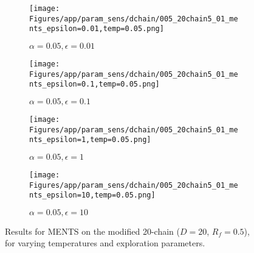 \documentclass{article}
\theoremstyle{plain}
\begin{document}
\begin{appendices}
\begin{figure}
                \begin{subfigure}[b]{0.24\textwidth}
                    \centering
                    \texttt{[image: Figures/app/param\_sens/dchain/005\_20chain5\_01\_ments\_epsilon=0.01,temp=0.05.png]}
                    \caption*{$\alpha=0.05,\epsilon=0.01$}
                \end{subfigure}
                \begin{subfigure}[b]{0.24\textwidth}
                    \centering
                    \texttt{[image: Figures/app/param\_sens/dchain/005\_20chain5\_01\_ments\_epsilon=0.1,temp=0.05.png]}
                    \caption*{$\alpha=0.05,\epsilon=0.1$}
                \end{subfigure}
                \begin{subfigure}[b]{0.24\textwidth}
                    \centering
                    \texttt{[image: Figures/app/param\_sens/dchain/005\_20chain5\_01\_ments\_epsilon=1,temp=0.05.png]}
                    \caption*{$\alpha=0.05,\epsilon=1$}
                \end{subfigure}
                \begin{subfigure}[b]{0.24\textwidth}
                    \centering
                    \texttt{[image: Figures/app/param\_sens/dchain/005\_20chain5\_01\_ments\_epsilon=10,temp=0.05.png]}
                    \caption*{$\alpha=0.05,\epsilon=10$}
                \end{subfigure}
                
                \caption{Results for MENTS on the modified 20-chain ($D=20$, $R_f=0.5$), for varying temperatures and exploration parameters.}
                \label{fig:ments_20chain_half_hps}
            \end{figure}


            \begin{figure}
                \centering
                

\end{figure}
\end{appendices}
\end{document}
